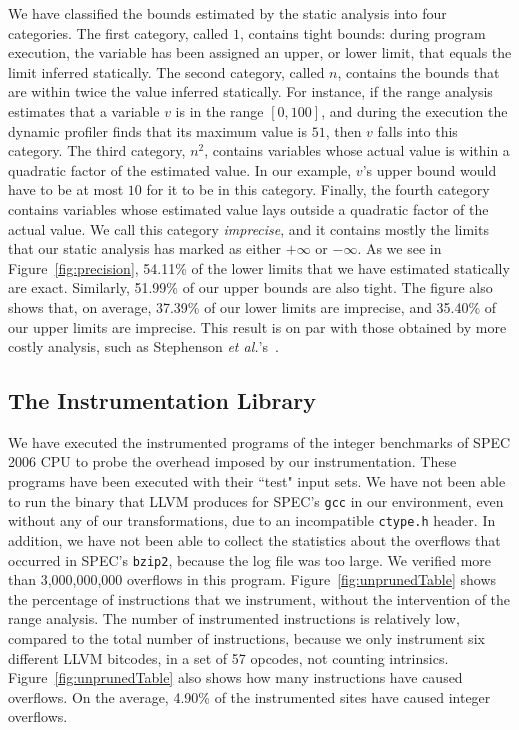 \documentclass{sigplanconf}[10pt]
\begin{document}
We have classified the bounds estimated by the static analysis into four
categories.
The first category, called $1$, contains tight bounds:
during program execution, the variable has been assigned an upper,
or lower limit, that equals the limit inferred statically.
The second category, called $n$, contains the bounds that are
within twice the value inferred statically.
For instance, if the range analysis estimates that a variable $v$ is in the
range $[0, 100]$, and during the execution the dynamic profiler finds that
its maximum value is $51$, then $v$ falls into this category.
The third category, $n^2$, contains variables whose actual value is within
a quadratic factor of the estimated value.
In our example, $v$'s upper bound would have to be at most $10$ for it to
be in this category.
Finally, the fourth category contains variables whose estimated value lays
outside a quadratic factor of the actual value.
We call this category {\em imprecise}, and it contains mostly the limits that
our static analysis has marked as either $+\infty$ or $-\infty$.
As we see in Figure~\ref{fig:precision}, 54.11\% of the lower limits that
we have estimated statically are exact.
Similarly, 51.99\% of our upper bounds are also tight.
The figure also shows that, on average, 37.39\% of our lower limits are
imprecise, and 35.40\% of our upper limits are imprecise.
This result is on par with those obtained by more costly analysis, such as
Stephenson {\em et al.}'s~\cite{Stephenson00}.




\subsection{The Instrumentation Library}
\label{sub:inst}

We have executed the instrumented programs of the integer benchmarks of SPEC
2006 CPU to probe the overhead imposed by our instrumentation.
These programs have been executed with their ``test" input sets.
We have not been able to run the binary that LLVM produces for SPEC's
\texttt{gcc} in our environment, even without any of our transformations, due
to an incompatible \texttt{ctype.h} header.
In addition, we have not been able to collect the statistics about
the overflows that occurred in SPEC's \texttt{bzip2}, because the log file
was too large.
We verified more than 3,000,000,000  overflows in this program.
Figure~\ref{fig:unprunedTable} shows the percentage of instructions that
we instrument, without the intervention of the range analysis.
The number of instrumented instructions is relatively low, compared to the
total number of instructions, because we only instrument six different
LLVM bitcodes, in a set of 57 opcodes, not counting intrinsics.
Figure~\ref{fig:unprunedTable} also shows how many instructions have caused
overflows.
On the average, 4.90\% of the instrumented sites have caused integer overflows.
\end{document}
